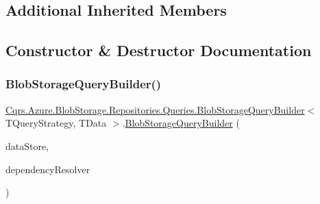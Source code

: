 \subsection*{Additional Inherited Members}


\subsection{Constructor \& Destructor Documentation}
\mbox{\label{classCqrs_1_1Azure_1_1BlobStorage_1_1Repositories_1_1Queries_1_1BlobStorageQueryBuilder_ae6519f289d2b7be9d322dfa7171dea8b}} 
\subsubsection{\texorpdfstring{Blob\+Storage\+Query\+Builder()}{BlobStorageQueryBuilder()}}
{\footnotesize\ttfamily \hyperlink{classCqrs_1_1Azure_1_1BlobStorage_1_1Repositories_1_1Queries_1_1BlobStorageQueryBuilder}{Cqrs.\+Azure.\+Blob\+Storage.\+Repositories.\+Queries.\+Blob\+Storage\+Query\+Builder}$<$ T\+Query\+Strategy, T\+Data $>$.\hyperlink{classCqrs_1_1Azure_1_1BlobStorage_1_1Repositories_1_1Queries_1_1BlobStorageQueryBuilder}{Blob\+Storage\+Query\+Builder} (\begin{DoxyParamCaption}\item[{\hyperlink{interfaceCqrs_1_1DataStores_1_1IDataStore}{I\+Data\+Store}$<$ T\+Data $>$}]{data\+Store,  }\item[{\hyperlink{interfaceCqrs_1_1Configuration_1_1IDependencyResolver}{I\+Dependency\+Resolver}}]{dependency\+Resolver }\end{DoxyParamCaption})\hspace{0.3cm}{\ttfamily [protected]}}



